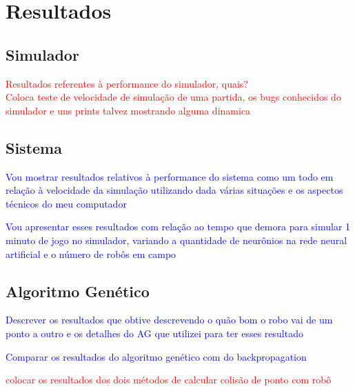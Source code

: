 \chapter{Resultados}
\section{Simulador}
\textcolor{red}{Resultados referentes à performance do simulador, quais?\\ Coloca teste de velocidade de simulação de uma partida, os bugs conhecidos do simulador e uns prints talvez mostrando alguma dinamica}


\section{Sistema}
\textcolor{blue}{
Vou mostrar resultados relativos à performance do sistema como um todo em relação à velocidade da simulação utilizando dada várias situações e os aspectos técnicos do meu computador}

\textcolor{blue}{
Vou apresentar esses resultados com relação ao tempo que demora para simular 1 minuto de jogo no simulador, variando a quantidade de neurônios na rede neural artificial e o número de robôs em campo}

\section{Algoritmo Genético}
\textcolor{blue}{Descrever os resultados que obtive descrevendo o quão bom o robo vai de um ponto a outro e os detalhes do AG que utilizei para ter esses resultado}

\textcolor{blue}{Comparar os resultados do algoritmo genético com do backpropagation}

\textcolor{red}{colocar os resultados dos dois métodos de calcular colisão de ponto com robô}

